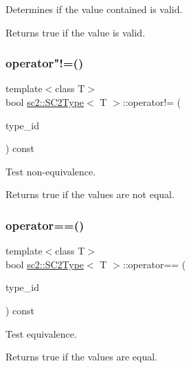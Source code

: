 Determines if the value contained is valid. \begin{DoxyReturn}{Returns}
\textquotesingle{}true\textquotesingle{} if the value is valid. 
\end{DoxyReturn}
\mbox{\label{classsc2_1_1_s_c2_type_a6e032550a699843364b52d9f30d7ddcc}} 
\subsubsection{\texorpdfstring{operator"!=()}{operator!=()}}
{\footnotesize\ttfamily template$<$class T$>$ \\
bool \hyperlink{classsc2_1_1_s_c2_type}{sc2\+::\+S\+C2\+Type}$<$ T $>$\+::operator!= (\begin{DoxyParamCaption}\item[{\hyperlink{classsc2_1_1_s_c2_type}{S\+C2\+Type}$<$ T $>$}]{type\+\_\+id }\end{DoxyParamCaption}) const\hspace{0.3cm}{\ttfamily [inline]}}

Test non-\/equivalence. \begin{DoxyReturn}{Returns}
\textquotesingle{}true\textquotesingle{} if the values are not equal. 
\end{DoxyReturn}
\mbox{\label{classsc2_1_1_s_c2_type_a499b06e107c0561ce3d2d80094fbdd94}} 
\subsubsection{\texorpdfstring{operator==()}{operator==()}}
{\footnotesize\ttfamily template$<$class T$>$ \\
bool \hyperlink{classsc2_1_1_s_c2_type}{sc2\+::\+S\+C2\+Type}$<$ T $>$\+::operator== (\begin{DoxyParamCaption}\item[{\hyperlink{classsc2_1_1_s_c2_type}{S\+C2\+Type}$<$ T $>$}]{type\+\_\+id }\end{DoxyParamCaption}) const\hspace{0.3cm}{\ttfamily [inline]}}

Test equivalence. \begin{DoxyReturn}{Returns}
\textquotesingle{}true\textquotesingle{} if the values are equal. 
\end{DoxyReturn}
\mbox{\label{classsc2_1_1_s_c2_type_a25533b72e301be4064d80a13c82dc506}} 

